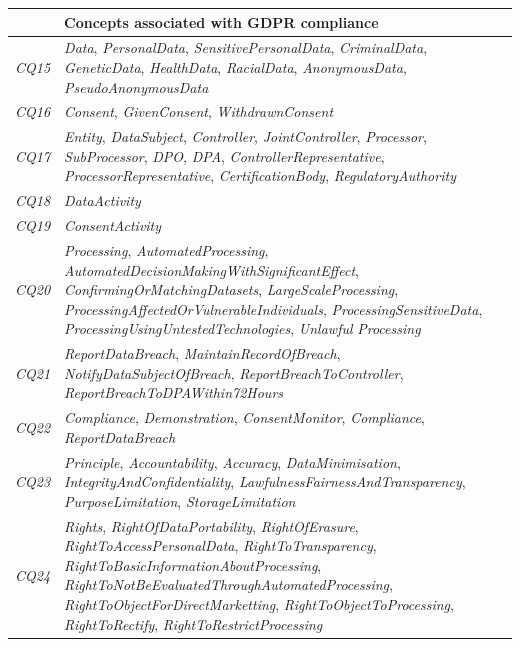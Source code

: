 \begin{table}[htbp]
\begin{tabularx}{\textwidth}{|l|X|}
& \textbf{Concepts associated with GDPR compliance} \\ \hline
\textit{CQ15} & \textit{Data}, \textit{PersonalData}, \textit{SensitivePersonalData}, \textit{CriminalData}, \textit{GeneticData}, \textit{HealthData}, \textit{RacialData}, \textit{AnonymousData}, \textit{PseudoAnonymousData} \\ \hline
\textit{CQ16} & \textit{Consent}, \textit{GivenConsent}, \textit{WithdrawnConsent} \\ \hline
\textit{CQ17} & \textit{Entity}, \textit{DataSubject}, \textit{Controller}, \textit{JointController}, \textit{Processor}, \textit{SubProcessor}, \textit{DPO}, \textit{DPA}, \textit{ControllerRepresentative}, \textit{ProcessorRepresentative}, \textit{CertificationBody}, \textit{RegulatoryAuthority} \\ \hline
\textit{CQ18} & \textit{DataActivity} \\ \hline
\textit{CQ19} & \textit{ConsentActivity} \\ \hline
\textit{CQ20} & \textit{Processing}, \textit{AutomatedProcessing}, \textit{AutomatedDecisionMakingWithSignificantEffect}, \textit{ConfirmingOrMatchingDatasets}, \textit{LargeScaleProcessing}, \textit{ProcessingAffectedOrVulnerableIndividuals}, \textit{ProcessingSensitiveData}, \textit{ProcessingUsingUntestedTechnologies}, \textit{Unlawful} \textit{Processing} \\ \hline
\textit{CQ21} & \textit{ReportDataBreach}, \textit{MaintainRecordOfBreach},  \textit{NotifyDataSubjectOfBreach}, \textit{ReportBreachToController}, \textit{ReportBreachToDPAWithin72Hours} \\ \hline
\textit{CQ22} & \textit{Compliance}, \textit{Demonstration}, \textit{ConsentMonitor}, \textit{Compliance}, \textit{ReportDataBreach}  \\ \hline
\textit{CQ23} & \textit{Principle}, \textit{Accountability}, \textit{Accuracy}, \textit{DataMinimisation}, \textit{IntegrityAndConfidentiality}, \textit{LawfulnessFairnessAndTransparency}, \textit{PurposeLimitation}, \textit{StorageLimitation}  \\ \hline
\textit{CQ24} & \textit{Rights}, \textit{RightOfDataPortability}, \textit{RightOfErasure}, \textit{RightToAccessPersonalData}, \textit{RightToTransparency}, \textit{RightToBasicInformationAboutProcessing}, \textit{RightToNotBeEvaluatedThroughAutomatedProcessing}, \textit{RightToObjectForDirectMarketting}, \textit{RightToObjectToProcessing}, \textit{RightToRectify}, \textit{RightToRestrictProcessing} \\ \hline

\end{tabularx}
\end{table}
